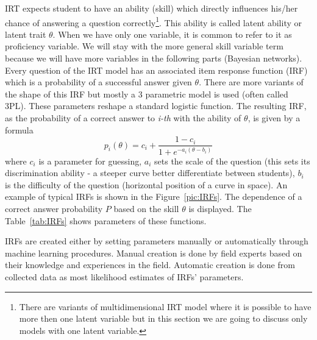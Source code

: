 IRT expects student to have an ability (skill) which directly influences his/her chance of answering a question correctly\footnote{There are variants of multidimensional IRT model where it is possible to have more then one latent variable but in this section we are going to discuss only models with one latent variable.}. This ability is called latent ability or latent trait $\theta$. When we have only one variable, it is common to refer to it as proficiency variable. We will stay with the more general skill variable term because we will have more variables in the following parts (Bayesian networks). Every question of the IRT model has an associated item response function (IRF) which is a probability of a successful answer given $\theta$. There are more variants of the shape of this IRF but mostly a 3 parametric model is used (often called 3PL). These parameters reshape a standard logistic function. The resulting IRF, as the probability of a correct answer to \textit{i-th} with the ability of $\theta$, is given by a formula
\begin{equation}
p_i(\theta) = c_i + \frac{1-c_i}{1+e^{-a_i(\theta-b_i)}}
\label{eq:IRF}
\end{equation}
where $c_i$ is a parameter for guessing, $a_i$ sets the scale of the question (this sets its discrimination ability - a steeper curve better differentiate between students), $b_i$ is the difficulty of the question (horizontal position of a curve in space). An example of typical IRFs is shown in the Figure~\ref{pic:IRFs}. The dependence of a correct answer probability $P$ based on the skill $\theta$ is displayed. The Table~\ref{tab:IRFs} shows parameters of these functions.

IRFs are created either by setting parameters manually or automatically through machine learning procedures. Manual creation is done by field experts based on their knowledge and experiences in the field. Automatic creation is done from collected data as most likelihood estimates of IRFs' parameters.

